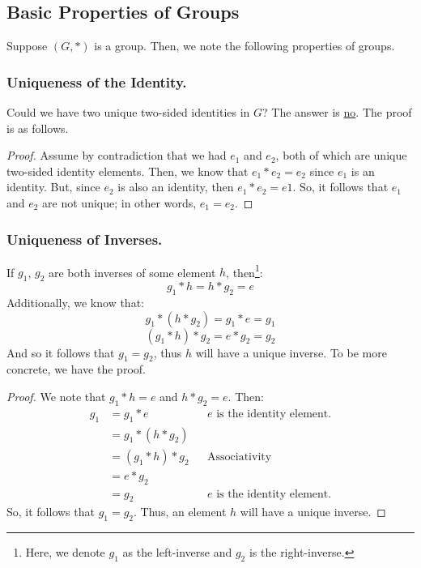 \documentclass[letterpaper]{article}
\begin{document}
\subsection{Basic Properties of Groups}
Suppose $(G, *)$ is a group. Then, we note the following properties of groups. 

\subsubsection{Uniqueness of the Identity.} 
Could we have two unique two-sided identities in $G$? The answer is \underline{no}. The proof is as follows. 

\begin{mdframed}
    \begin{proof}
        Assume by contradiction that we had $e_1$ and $e_2$, both of which are unique two-sided identity elements. Then, we know that $e_1 * e_2 = e_2$ since $e_1$ is an identity. But, since $e_2$ is also an identity, then $e_1 * e_2 = e1$. So, it follows that $e_1$ and $e_2$ are not unique; in other words, $e_1 = e_2$. 
    \end{proof}
\end{mdframed}

\subsubsection{Uniqueness of Inverses.}

If $g_1$, $g_2$ are both inverses of some element $h$, then\footnote{Here, we denote $g_1$ as the left-inverse and $g_2$ is the right-inverse.}:
\[g_1 * h = h * g_2 = e\]
Additionally, we know that:
\[g_1 * (h * g_2) = g_1 * e = g_1\]
\[(g_1 * h) * g_2 = e * g_2 = g_2\]
And so it follows that $g_1 = g_2$, thus $h$ will have a unique inverse. To be more concrete, we have the proof. 
\begin{mdframed}
    \begin{proof}
        We note that $g_1 * h = e$ and $h * g_2 = e$. Then:
        \begin{equation*}
            \begin{aligned}
                g_1 &= g_1 * e && e \text{ is the identity element.} \\ 
                    &= g_1 * (h * g_2) \\ 
                    &= (g_1 * h) * g_2 && \text{Associativity} \\ 
                    &= e * g_2 \\ 
                    &= g_2 && e \text{ is the identity element.}
            \end{aligned}
        \end{equation*}
        So, it follows that $g_1 = g_2$. Thus, an element $h$ will have a unique inverse. 
    \end{proof}
\end{mdframed}
\end{document}

